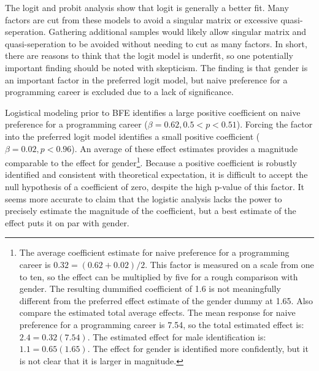 \documentclass[review]{elsarticle}
\begin{document}
The logit and probit analysis show that logit is generally a better fit.
Many factors are cut from these models to avoid a singular matrix or excessive quasi-seperation.
Gathering additional samples would likely allow singular matrix and quasi-seperation to be avoided
without needing to cut as many factors.
In short, there are reasons to think that the logit model is underfit,
so one potentially important finding should be noted with skepticism.
The finding is that gender is an important factor in the preferred logit model,
but naive preference for a programming career is excluded due to a lack of significance.

Logistical modeling prior to BFE identifies a large positive coefficient on naive preference for a programming career ($\beta = 0.62, 0.5 < p < 0.51$).
Forcing the factor into the preferred logit model identifies a small positive coefficient ($\beta = 0.02, p < 0.96$).
An average of these effect estimates provides a magnitude comparable to the effect for gender\footnote{
    The average coefficient estimate for naive preference for a programming career is $0.32 = (0.62 + 0.02) / 2$.
    This factor is measured on a scale from one to ten,
    so the effect can be multiplied by five for a rough comparison with gender.
    The resulting dummified coefficient of 1.6 is not meaningfully different from the preferred effect estimate of the
    gender dummy at 1.65.
    Also compare the estimated total average effects.
    The mean response for naive preference for a programming career is 7.54, so the total estimated effect is:
    $2.4 = 0.32(7.54)$.
    The estimated effect for male identification is:
    $1.1 = 0.65(1.65)$.
    The effect for gender is identified more confidently, but it is not clear that it is larger in magnitude.
}.
Because a positive coefficient is robustly identified and consistent with theoretical expectation,
it is difficult to accept the null hypothesis of a coefficient of zero,
despite the high p-value of this factor.
It seems more accurate to claim that the logistic analysis lacks the power to precisely estimate the magnitude of the coefficient,
but a best estimate of the effect puts it on par with gender.
\end{document}
